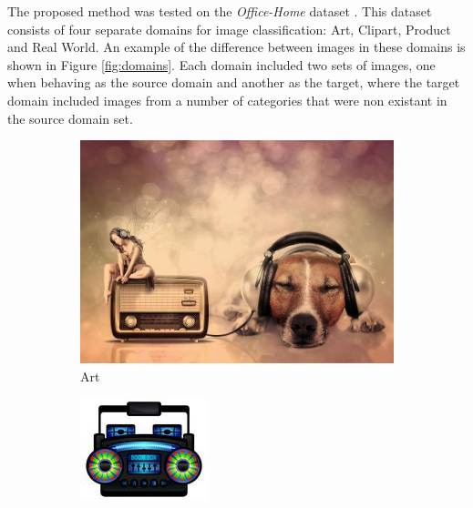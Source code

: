 \documentclass[10pt,twocolumn,letterpaper]{article}
\begin{document}
The proposed method was tested on the \textit{Office-Home} dataset \cite{OfficeHome}. This dataset consists of four separate domains for image classification: Art, Clipart, Product and Real World. An example of the difference between images in these domains is shown in Figure \ref{fig:domains}. Each domain included two sets of images, one when behaving as the source domain and another as the target, where the target domain included images from a number of categories that were non existant in the source domain set.

\begin{figure}[!htbp]
  \centering
  \begin{adjustbox}{minipage=\linewidth,scale=0.8}
  \begin{subfigure}[b]{0.45\columnwidth}
    \centering
    \includegraphics[width=\linewidth]{Figures/Art_Radio.jpg}
    \caption{Art}
    \label{fig:short-a}
  \end{subfigure}
  \hfill
  \begin{subfigure}[b]{0.45\columnwidth}
\centering
    \includegraphics[width=\linewidth]{Figures/Clipart_Radio.jpg}

\end{subfigure}
\end{adjustbox}
\end{figure}
\end{document}
